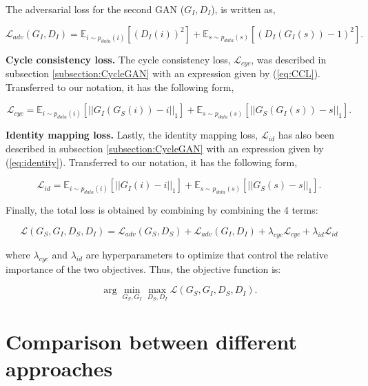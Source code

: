 The adversarial loss for the second \ac{GAN} ($G_{I}, D_I$), is written as,

\begin{equation}
    \mathcal{L}_{adv}(G_{I},D_I) = \mathbb{E}_{i \sim p_{data}(i)} [(D_I(i))^2] + \mathbb{E}_{s \sim p_{data}(s)} [(D_I(G_{I}(s))-1)^2].
\end{equation}

\textbf{Cycle consistency loss.} The cycle consistency loss, $\mathcal{L}_{cyc}$, was described in subsection \ref{subsection:CycleGAN} with an expression given by (\ref{eq:CCL}). Transferred to our notation, it has the following form,

\begin{equation} 
\mathcal{L}_{cyc} = \mathbb{E}_{i \sim p_{data}(i)} [||G_{I}(G_{S}(i))-i||_1] + \mathbb{E}_{s \sim p_{data}(s)} [||G_{S}(G_{I}(s))-s||_1].
\label{eq:cly_2}
\end{equation}

\textbf{Identity mapping loss.} Lastly, the identity mapping loss, $\mathcal{L}_{id}$ has also been described in subsection \ref{subsection:CycleGAN} with an expression given by (\ref{eq:identity}). Transferred to our notation, it has the following form,

\begin{equation}
    \mathcal{L}_{id} = \mathbb{E}_{i \sim p_{data}(i)} [||G_{I}(i)-i||_1] +  \mathbb{E}_{s \sim p_{data}(s)} [||G_{S}(s)-s||_1].
\end{equation}

Finally, the total loss is obtained by combining by combining the 4 terms:

\begin{equation}
\label{eq:total-cyclegan-loss}
    \mathcal{L}(G_{S},G_{I},D_S,D_I) = \mathcal{L}_{adv}(G_{S},D_S) + \mathcal{L}_{adv}(G_{I},D_I) + \lambda_{cyc} \mathcal{L}_{cyc} + \lambda_{id} \mathcal{L}_{id}
\end{equation}

\noindent where $\lambda_{cyc}$ and $\lambda_{id}$ are hyperparameters to optimize that control the relative importance of the two objectives. Thus, the objective function is:

\begin{equation}
    \arg \min_{G_{S},G_{I}}\max_{D_S,D_I} \mathcal{L}(G_{S},G_{I},D_S,D_I).
\end{equation}

\section{Comparison between different approaches}
\label{section:comparison}

